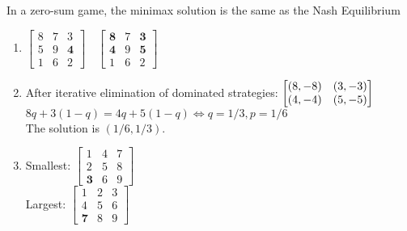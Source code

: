 \documentclass[../main.tex]{subfiles}
\begin{document}
\begin{solution}
In a zero-sum game, the minimax solution is the same as the Nash Equilibrium
\begin{enumerate}
	\item 
	$	\begin{bmatrix}
	  		8 & 7 & 3 \\
	  		5 & 9 & \textbf{4} \\
	  		1 & 6 & 2
	 	\end{bmatrix}
		\quad
		\begin{bmatrix}
			\textbf{8} & 7 & \textbf{3} \\
			\textbf{4} & 9 & \textbf{5} \\
			1 & 6 & 2
		 \end{bmatrix}
	$	 
	\item After iterative elimination of dominated strategies: 
	$
		\begin{bmatrix}
		(8,-8) & (3,-3) \\
		(4,-4) & (5,-5)
		\end{bmatrix} \\
	$	
	$ 8q + 3(1-q) = 4q + 5(1-q)
		 \Leftrightarrow q = 1/3, p = 1/6$\\
	The solution is $(1/6,1/3)$.
	
	\item
	Smallest: 
	$	\begin{bmatrix}
		 	1 & 4 & 7 \\
		 	2 & 5 & 8 \\
		 	\textbf{3} & 6 & 9
		 \end{bmatrix}$\\
	Largest:
	$	\begin{bmatrix}
		 	1 & 2 & 3 \\
		 	4 & 5 & 6 \\
		 	\textbf{7} & 8 & 9
		\end{bmatrix}$\\
\end{enumerate}
\end{solution}
\end{document}
